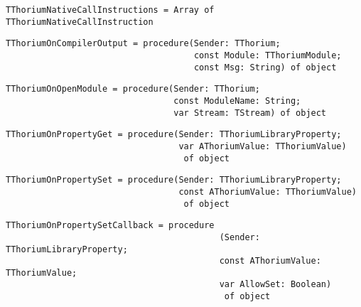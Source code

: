\begin{verbatim}
TThoriumNativeCallInstructions = Array of TThoriumNativeCallInstruction
\end{verbatim}
\label{thoriumcore:thorium:tthoriumnativecallinstructions}



\begin{verbatim}
TThoriumOnCompilerOutput = procedure(Sender: TThorium;
                                     const Module: TThoriumModule;
                                     const Msg: String) of object
\end{verbatim}
\label{thoriumcore:thorium:tthoriumoncompileroutput}



\begin{verbatim}
TThoriumOnOpenModule = procedure(Sender: TThorium;
                                 const ModuleName: String;
                                 var Stream: TStream) of object
\end{verbatim}
\label{thoriumcore:thorium:tthoriumonopenmodule}



\begin{verbatim}
TThoriumOnPropertyGet = procedure(Sender: TThoriumLibraryProperty;
                                  var AThoriumValue: TThoriumValue)
                                   of object
\end{verbatim}
\label{thoriumcore:thorium:tthoriumonpropertyget}



\begin{verbatim}
TThoriumOnPropertySet = procedure(Sender: TThoriumLibraryProperty;
                                  const AThoriumValue: TThoriumValue)
                                   of object
\end{verbatim}
\label{thoriumcore:thorium:tthoriumonpropertyset}



\begin{verbatim}
TThoriumOnPropertySetCallback = procedure
                                          (Sender: TThoriumLibraryProperty;
                                          const AThoriumValue: TThoriumValue;
                                          var AllowSet: Boolean)
                                           of object
\end{verbatim}
\label{thoriumcore:thorium:tthoriumonpropertysetcallback}



